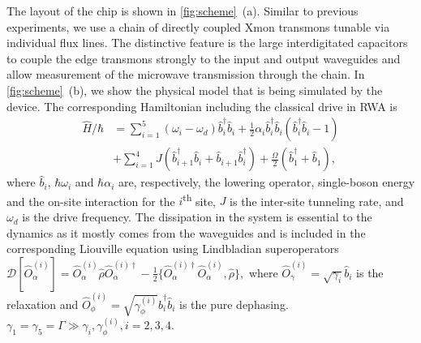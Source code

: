 \documentclass[%
 aps, pra,
 amsmath,amssymb,
 reprint,%
superscriptaddress
]{revtex4-2}
\begin{document}
The layout of the chip is shown in \autoref{fig:scheme}~(a). Similar to previous experiments, we use a chain of directly coupled Xmon transmons tunable via individual flux lines. The distinctive feature is the large interdigitated capacitors to couple the edge transmons strongly to the input and output waveguides and allow measurement of the microwave transmission through the chain. In \autoref{fig:scheme}~(b), we show the physical model that is being simulated by the device. The corresponding Hamiltonian including the classical drive in RWA is
\begin{equation}
\begin{aligned}
\hat H/\hbar &= \sum_{i=1}^5 (\omega_i - \omega_d) \hat b^\dag_i \hat b_i + \frac{1}{2} \alpha_i \hat b_i^\dag \hat b_i (\hat b^\dag_i \hat b_i - 1)\\
&+\sum_{i=1}^4 J (\hat b^\dag_{i+1} \hat b_i + \hat b_{i+1} \hat b_i^\dag)+\frac{\Omega}{2}(\hat b_1^\dag + \hat b_1),
\end{aligned}\label{eq:bose-hubbard}
\end{equation} 
where $\hat b_i$, $\hbar \omega_i$ and $\hbar\alpha_i$ are, respectively, the lowering operator, single-boson energy and the on-site interaction for the $i$\textsuperscript{th} site, $J$ is the inter-site tunneling rate, and $\omega_d$ is the drive frequency. The dissipation in the system is essential to the dynamics as it mostly comes from the waveguides and is included in the corresponding Liouville equation using Lindbladian superoperators $\mathcal D[\hat{O}^{(i)}_\alpha] = \hat{O}^{(i)}_\alpha \hat \rho \hat{O}^{(i)\dag}_\alpha - \frac{1}{2}\{\hat{O}^{(i)\dag}_\alpha \hat{O}^{(i)}_\alpha, \hat \rho\},$ where $\hat{O}^{(i)}_\gamma = \sqrt{\gamma_i} \hat b_i$ is the relaxation and $\hat{O}^{(i)}_\phi = \sqrt{\gamma^{(i)}_\phi} \hat b_i^\dag \hat b_i$ is the pure dephasing. $\gamma_1 = \gamma_5 = \Gamma \gg \gamma_i, \gamma_\phi^{(i)}, i=2,3,4$.
\end{document}
